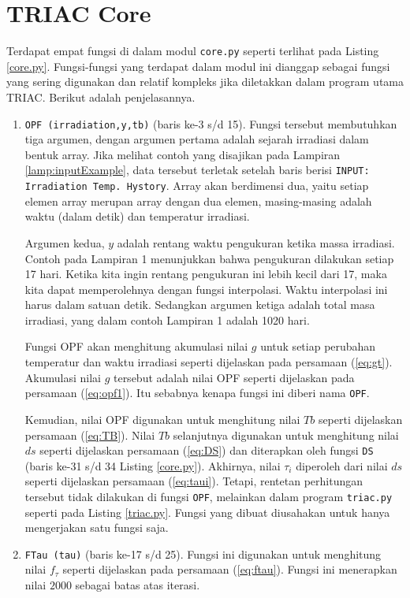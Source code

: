 \documentclass[a4paper,11pt]{report}
\begin{document}
\section{TRIAC Core}
Terdapat empat fungsi di dalam modul \texttt{core.py} seperti terlihat pada Listing \ref{core.py}. Fungsi-fungsi yang terdapat dalam modul ini dianggap sebagai fungsi yang sering digunakan dan relatif kompleks jika diletakkan dalam program utama TRIAC. Berikut adalah penjelasannya.

\begin{enumerate}
\item \texttt{OPF (irradiation,y,tb)} (baris ke-3 s/d 15). Fungsi tersebut membutuhkan tiga argumen, dengan argumen pertama adalah sejarah irradiasi dalam bentuk array. Jika melihat contoh yang disajikan pada Lampiran \ref{lamp:inputExample}, data tersebut terletak setelah baris berisi \texttt{INPUT: Irradiation Temp. Hystory}. Array akan berdimensi dua, yaitu setiap elemen array merupan array dengan dua elemen, masing-masing adalah waktu (dalam detik) dan temperatur irradiasi.

Argumen kedua, $y$ adalah rentang waktu pengukuran ketika massa irradiasi. Contoh pada Lampiran 1 menunjukkan bahwa pengukuran dilakukan setiap 17 hari. Ketika kita ingin rentang pengukuran ini lebih kecil dari 17, maka kita dapat memperolehnya dengan fungsi interpolasi. Waktu interpolasi ini harus dalam satuan detik. Sedangkan argumen ketiga adalah total masa irradiasi, yang dalam contoh Lampiran 1 adalah 1020 hari.

Fungsi OPF akan menghitung akumulasi nilai $g$ untuk setiap perubahan temperatur dan waktu irradiasi seperti dijelaskan pada persamaan (\ref{eq:gt}). Akumulasi nilai $g$ tersebut adalah nilai OPF seperti dijelaskan pada persamaan (\ref{eq:opf1}). Itu sebabnya kenapa fungsi ini diberi nama \texttt{OPF}.

Kemudian, nilai OPF digunakan untuk menghitung nilai $Tb$ seperti dijelaskan persamaan (\ref{eq:TB}). Nilai $Tb$ selanjutnya digunakan untuk menghitung nilai $ds$ seperti dijelaskan persamaan (\ref{eq:DS}) dan diterapkan oleh fungsi \texttt{DS} (baris ke-31 s/d 34 Listing \ref{core.py}). Akhirnya, nilai $\tau_i$ diperoleh dari nilai $ds$ seperti dijelaskan persamaan (\ref{eq:taui}). Tetapi, rentetan perhitungan tersebut tidak dilakukan di fungsi \texttt{OPF}, melainkan dalam program \texttt{triac.py} seperti pada Listing \ref{triac.py}. Fungsi yang dibuat diusahakan untuk hanya mengerjakan satu fungsi saja.

\item \texttt{FTau (tau)} (baris ke-17 s/d 25). Fungsi ini digunakan untuk menghitung nilai $f_{\tau}$ seperti dijelaskan pada persamaan (\ref{eq:ftau}). Fungsi ini menerapkan nilai $2000$ sebagai batas atas iterasi.


\end{enumerate}
\end{document}
